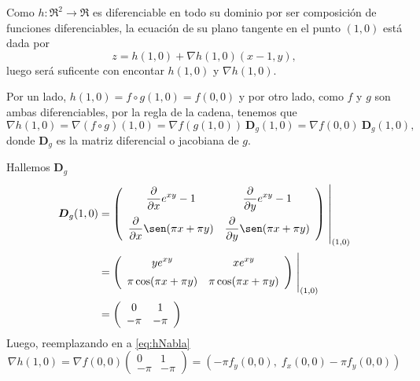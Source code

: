 \begin{solution}
     
Como   $h:\Re^2\to\Re$ es diferenciable en todo su dominio por ser composición de funciones diferenciables,  la ecuaci\'on de su plano tangente en el punto $(1,0)$ est\'a dada por  
\begin{equation}
            z= h(1,0) + \nabla h(1,0) (x-1,y),  \label{eq:zNabla}
\end{equation}   luego ser\'a  suficente con encontar $ h(1,0)$ y $\nabla h(1,0).$ 
        
Por un lado,      $h(1,0)= f\circ g (1,0) =  f(0,0)$  y por otro lado,  como $f$ y $g$ son ambas diferenciables,  por la regla de la cadena,  tenemos que
\begin{equation}
       \nabla h(1,0)=\nabla (f\circ g)(1,0)=\nabla f(g(1,0)) \:\boldsymbol{D}_g(1,0) = \nabla f (0,0) \:\boldsymbol{D}_g(1,0),  \label{eq:hNabla}
\end{equation}    donde $\boldsymbol{D}_g$ es la matriz diferencial o  jacobiana de $g$. 

\noindent  Hallemos $\boldsymbol{D}_g$
       \begin{align*}
            \boldsymbol{D}_g(1,0)&=
            \left(\begin{array}{cc}
                \displaystyle\partialx e^{xy}-1  & \displaystyle\partialy e^{xy}-1 \\[10pt]
                \displaystyle\partialx  \sen (\pi x+\pi y)&\displaystyle\partialy \sen (\pi x+\pi y)
            \end{array}\right)\left.\rule{0pt}{1.1cm}\right\rvert_{(1,0)}\\[2pt]
            &=\left(\begin{array}{cc}
                \displaystyle ye^{xy}  & \displaystyle xe^{xy} \\[5pt]
                \displaystyle   \pi\cos (\pi x+\pi y)&\displaystyle \pi\cos(\pi x+\pi y)
           \end{array}\right)\left.\rule{0pt}{0.7cm}\right\rvert_{(1,0)}\\[2pt]
           &=\left(\begin{array}{cc}
                0 & 1\\
             -\pi & -\pi
            \end{array}\right)
        \end{align*}
Luego, reemplazando en  a   \eqref{eq:hNabla}
  \[
        \nabla h(1,0) = \nabla f(0,0)\left(\begin{array}{cc}
                0 & 1\\
               -\pi & -\pi
           \end{array}\right) = \left(-\pi f_y(0,0),\;f_x(0,0)-\pi f_y(0,0)\right)
 \]


\end{solution}
